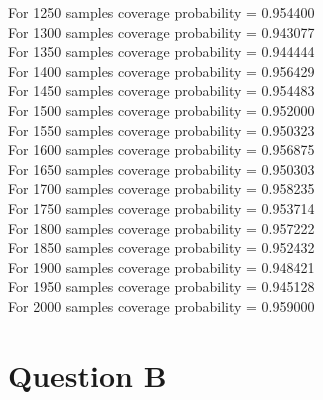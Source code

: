 \documentclass{article}
\begin{document}
For 1250 samples coverage probability = 0.954400\\
For 1300 samples coverage probability = 0.943077\\
For 1350 samples coverage probability = 0.944444\\
For 1400 samples coverage probability = 0.956429\\
For 1450 samples coverage probability = 0.954483\\
For 1500 samples coverage probability = 0.952000\\
For 1550 samples coverage probability = 0.950323\\
For 1600 samples coverage probability = 0.956875\\
For 1650 samples coverage probability = 0.950303\\
For 1700 samples coverage probability = 0.958235\\
For 1750 samples coverage probability = 0.953714\\
For 1800 samples coverage probability = 0.957222\\
For 1850 samples coverage probability = 0.952432\\
For 1900 samples coverage probability = 0.948421\\
For 1950 samples coverage probability = 0.945128\\
For 2000 samples coverage probability = 0.959000\\


\section{Question B}

\end{document}
